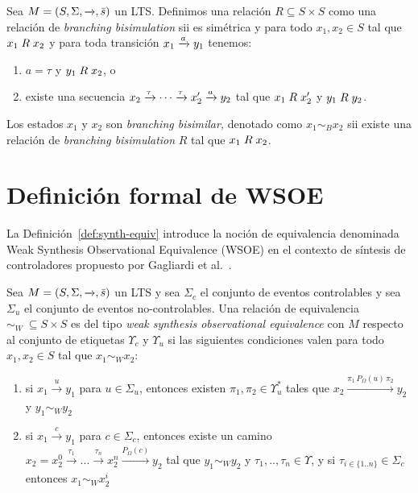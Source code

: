 \begin{definition}
\label{def:branching}
Sea $M = (S, \Sigma, \xrightarrow[]{}, \bar{s})$ un LTS.
Definimos una relación  $R\subseteq S\times S$
como una relación de \textit{branching bisimulation} sii es simétrica y para todo $x_1,x_2\in S$ tal que ${x_1 \mathrel{R} x_2}$
y para toda transición $x_1 \pijl{a} y_1$ tenemos:
\begin{enumerate}
\item
$a=\tau$ y ${y_1 \mathrel{R} x_2}$, o
\item   \label{def:branching:simulating-transition}
existe una secuencia
$x_2\pijl{\tau}\cdots\pijl{\tau} x_2'\pijl{a}y_2$
tal que ${x_1 \mathrel{R} x_2'}$ y ${y_1 \mathrel{R} y_2}$.
\end{enumerate}
Los estados $x_1$ y $x_2$ son \textit{branching bisimilar,} denotado como $x_1\sim_{B}x_2$
sii existe una relación de \textit{branching bisimulation} $R$ tal que
${x_1 \mathrel{R} x_2}$.
\end{definition}

\section{Definición formal de WSOE}
\label{sec:def-wsoe}
La Definición~\ref{def:synth-equiv} introduce la noción de equivalencia denominada Weak Synthesis Observational Equivalence (WSOE) en el contexto de síntesis de controladores propuesto por Gagliardi et al.~\cite{compositional}.


\begin{definition}
    \label{def:synth-equiv}
    Sea $M = (S, \Sigma, \xrightarrow[]{}, \bar{s})$ un LTS y sea $\Sigma_c$ el conjunto de eventos controlables y sea $\Sigma_u$ el conjunto de eventos no-controlables. Una relación de equivalencia $\sim_{W} \ \subseteq S \times S$ es del tipo \textit{weak synthesis observational equivalence} con $M$ respecto al conjunto de etiquetas $\Upsilon_c$ y $\Upsilon_u$ si las siguientes condiciones valen para todo $x_1, x_2 \in S$ tal que $x_1 \sim_{W} x_2$:
\vspace{-0.2pt}
    \begin{enumerate}
        \item si $x_1 \xrightarrow[]{u} y_1$ para $u \in \Sigma_u$, entonces existen $\pi_1, \pi_2 \in \Upsilon_u^{*}$ tales que $x_2 \xrightarrow[]{\pi_1\, P_{\Omega}(u)\, \pi_2} y_2$ y $y_1 \sim_{W} y_2$
        \item si $x_1 \xrightarrow[]{c} y_1$ para $c \in \Sigma_c$, entonces existe un camino $x_2 = x_2^{0} \xrightarrow[]{\tau_1} ... \xrightarrow[]{\tau_n} x_2^{n} \xrightarrow[]{P_{\Omega}(c)} y_2$ tal que $y_1 \sim_{W} y_2$ y $\tau_1, .., \tau_n \in \Upsilon$, y si $\tau_{i\in\{1 .. n\}} \in \Sigma_c$ entonces $x_1 \sim_{W} x_2^i$
    \end{enumerate}
\end{definition}

